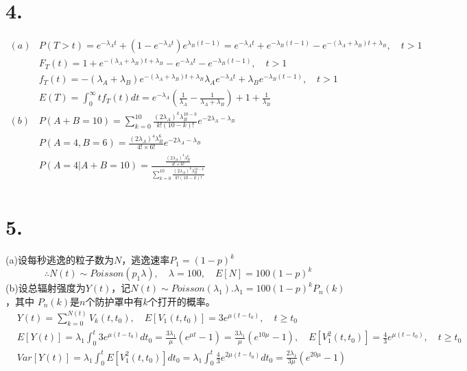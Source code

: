 \documentclass[UTF8]{ctexart}
\begin{document}
\section*{4.}
\begin{equation*}
  \begin{aligned}
    (a) & P(T>t)=e^{-\lambda_At}+(1-e^{-\lambda_A t})e^{\lambda_B(t-1)}=e^{-\lambda_A t}
    +e^{-\lambda_B(t-1)}-e^{-(\lambda_A+\lambda_B)t+\lambda_B},\quad t>1                   \\
        & F_T(t)=1+e^{-(\lambda_A+\lambda_B)t+\lambda_B}-e^{-\lambda_At}
    -e^{-\lambda_B(t-1)},\quad t>1                                                         \\
        & f_T(t)=-(\lambda_A+\lambda_B)e^{-(\lambda_A+\lambda_B)t+\lambda_B}
    \lambda_Ae^{-\lambda_At}+\lambda_Be^{-\lambda_B(t-1)},\quad t>1                        \\
        & E(T)=\int_0^\infty tf_T(t)dt=e^{-\lambda_A}(\frac{1}{\lambda_A}
    -\frac{1}{\lambda_A+\lambda_B})+1+\frac{1}{\lambda_B}                                  \\
    (b) & P(A+B=10)=\sum\limits_{k=0}^{10}\frac{(2\lambda_A)^k\lambda_B^{10-k}}{k!(10-k)!}
    e^{-2\lambda_A-\lambda_B}                                                              \\
        & P(A=4,B=6)=\frac{(2\lambda_A)^4\lambda_B^6}{4!\times6!}e^{-2\lambda_A-\lambda_B} \\
        & P(A=4\lvert A+B=10)=\frac{\frac{(2\lambda_A)^4\lambda_B^6}{4!\times6!}}
    {\sum\limits_{k=0}^{10}\frac{(2\lambda_A)^k\lambda_B^{10-k}}{k!(10-k)!}}               \\
  \end{aligned}
\end{equation*}
\section*{5.}
 (a)设每秒逃逸的粒子数为$N$，逃逸速率$P_1=(1-p)^k$
\begin{equation*}
  \therefore N(t)\sim Poisson(p_1\lambda),\quad \lambda=100,\quad E[N]=100(1-p)^k
\end{equation*}
(b)设总辐射强度为$Y(t)$，记$N(t)\sim Poisson(\lambda_1).\lambda_1=100(1-p)^kP_n(k)$，其中
$P_n(k)$是$n$个防护罩中有$k$个打开的概率。
\begin{equation*}
  \begin{aligned}
     & Y(t)=\sum\limits_{k=0}^{N(t)}V_k(t,t_0),\quad E[V_1(t,t_0)]=3e^{\mu(t-t_0)},\quad t\geq t_0       \\
     & E[Y(t)]=\lambda_1\int_0^t3e^{\mu(t-t_0)}dt_0=\frac{3\lambda_1}{\mu}(e^{\mu t}-1)
    =\frac{3\lambda_1}{\mu}(e^{10\mu}-1),\quad E[V_1^2(t,t_0)]=\frac{4}{3}e^{\mu(t-t_0)},\quad t\geq t_0 \\
     & Var[Y(t)]=\lambda_1\int_0^t E[V_1^2(t,t_0)]dt_0
    =\lambda_1\int_0^t\frac{4}{3}e^{2\mu(t-t_0)}dt_0=\frac{2\lambda_1}{3\mu}(e^{20\mu}-1)                \\
  \end{aligned}
\end{equation*}
\end{document}
